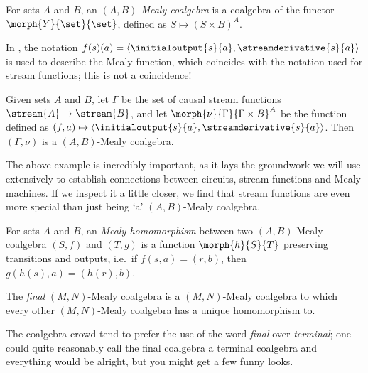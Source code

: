 \begin{definition}
    For sets \(A\) and \(B\), an \emph{\((A,B)\)-Mealy coalgebra} is a coalgebra
    of the functor \(\morph{Y}{\set}{\set}\), defined as
    \(S \mapsto (S \times B)^A\).
\end{definition}

\begin{example}
    In \cite{bonsangue2008coalgebraic}, the notation \(
    f(s)(a) = \langle{\initialoutput{s}{a},\streamderivative{s}{a}}\rangle
    \) is used to describe the Mealy function, which coincides with the notation
    used for stream functions; this is not a coincidence!

    Given sets \(A\) and \(B\), let \(\Gamma\) be the set of causal stream
    functions \(\stream{A} \to \stream{B}\), and let
    \(\morph{\nu}{\Gamma}{\Gamma \times B}^A\) be the function defined as \(
    (f, a) \mapsto \langle{\initialoutput{s}{a},\streamderivative{s}{a}}\rangle
    \).
    Then \((\Gamma,\nu)\) is a \((A,B)\)-Mealy coalgebra.
\end{example}

The above example is incredibly important, as it lays the groundwork we will
use extensively to establish connections between circuits, stream functions and
Mealy machines.
If we inspect it a little closer, we find that stream functions are even more
special than just being `a' \((A,B)\)-Mealy coalgebra.

\begin{definition}\label{def:mealy-homomorphism}
    For sets \(A\) and \(B\), an \emph{Mealy homomorphism} between two
    \((A,B)\)-Mealy coalgebra \((S,f)\) and \((T,g)\) is a function
    \(\morph{h}{S}{T}\) preserving transitions and
    outputs, i.e.\ if \(f(s,a) = (r,b)\), then \(g(h(s),a) = (h(r),b)\).
\end{definition}

The \emph{final} \((M,N)\)-Mealy coalgebra is a \((M,N)\)-Mealy coalgebra to
which every other \((M,N)\)-Mealy coalgebra has a unique homomorphism to.

\begin{remark}
    The coalgebra crowd tend to prefer the use of the word \emph{final} over
    \emph{terminal}; one could quite reasonably call the final coalgebra a
    terminal coalgebra and everything would be alright, but you might get a few
    funny looks.
\end{remark}

